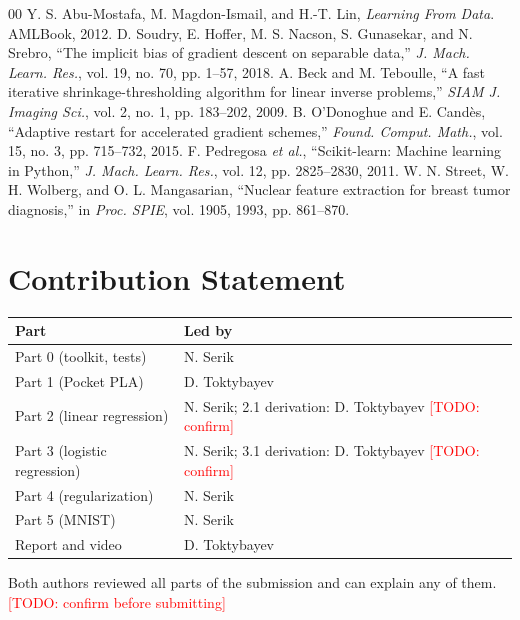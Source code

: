 \documentclass[conference]{IEEEtran}
\newcommand{\todo}[1]{\textcolor{red}{[TODO: #1]}}
\begin{document}
\begin{thebibliography}{00}
 Y. S. Abu-Mostafa, M. Magdon-Ismail, and H.-T. Lin, \textit{Learning From Data}. AMLBook, 2012.
 D. Soudry, E. Hoffer, M. S. Nacson, S. Gunasekar, and N. Srebro, ``The implicit bias of gradient descent on separable data,'' \textit{J. Mach. Learn. Res.}, vol. 19, no. 70, pp. 1--57, 2018.
 A. Beck and M. Teboulle, ``A fast iterative shrinkage-thresholding algorithm for linear inverse problems,'' \textit{SIAM J. Imaging Sci.}, vol. 2, no. 1, pp. 183--202, 2009.
 B. O'Donoghue and E. Cand\`es, ``Adaptive restart for accelerated gradient schemes,'' \textit{Found. Comput. Math.}, vol. 15, no. 3, pp. 715--732, 2015.
 F. Pedregosa \textit{et al.}, ``Scikit-learn: Machine learning in Python,'' \textit{J. Mach. Learn. Res.}, vol. 12, pp. 2825--2830, 2011.
 W. N. Street, W. H. Wolberg, and O. L. Mangasarian, ``Nuclear feature extraction for breast tumor diagnosis,'' in \textit{Proc. SPIE}, vol. 1905, 1993, pp. 861--870.
\end{thebibliography}

\section*{Contribution Statement}
\begin{center}\footnotesize
\begin{tabular}{p{}p{}}
\toprule
Part & Led by\\
\midrule
Part 0 (toolkit, tests) & N. Serik\\
Part 1 (Pocket PLA) & D. Toktybayev\\
Part 2 (linear regression) & N. Serik; 2.1 derivation: D. Toktybayev \todo{confirm}\\
Part 3 (logistic regression) & N. Serik; 3.1 derivation: D. Toktybayev \todo{confirm}\\
Part 4 (regularization) & N. Serik\\
Part 5 (MNIST) & N. Serik\\
Report and video & D. Toktybayev\\
\bottomrule
\end{tabular}
\end{center}
Both authors reviewed all parts of the submission and can explain any of them. \todo{confirm before submitting}
\end{document}
